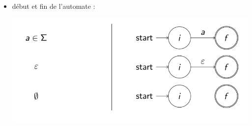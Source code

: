 \documentclass{article}
\begin{document}
\begin{itemize}
    \item début et fin de l'automate :
    \begin{center}
        \includegraphics[scale=0.3]{Image4.png}
    \end{center}
    

\end{itemize}
\end{document}

